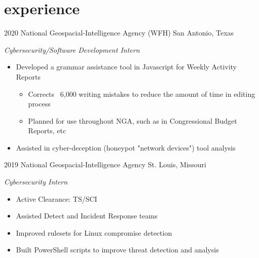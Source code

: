 \documentclass[]{friggeri-cv} %
\begin{document}

\vspace{-15pt}
\section{experience}
\vspace{-10pt}

\begin{entrylist}

	\entry
	{2020}
	{National Geospacial-Intelligence Agency (WFH)}
	{San Antonio, Texas}
	{\emph{Cybersecurity/Software Development Intern}
		\begin{itemize}
			\item Developed a grammar assistance tool in Javascript for Weekly Activity Reports
			\begin{itemize}
				\item Corrects ~6,000 writing mistakes to reduce the amount of time in editing process 
				\item Planned for use throughout NGA, such as in Congressional Budget Reports, etc 
			\end{itemize}
			\item Assisted in cyber-deception (honeypot "network devices") tool analysis
		\end{itemize}
	}
\vspace{-5pt}

	
	\entry
	{2019}
	{National Geospacial-Intelligence Agency}
	{St. Louis, Missouri}
	{\emph{Cybersecurity Intern}
		\begin{itemize}
			\item Active Clearance: TS/SCI
			\item Assisted Detect and Incident Response teams
			\item Improved rulesets for Linux compromise detection
			\item Built PowerShell scripts to improve threat detection and analysis
		\end{itemize}
	}
\vspace{-5pt}
	
	

\end{entrylist}
\end{document}
